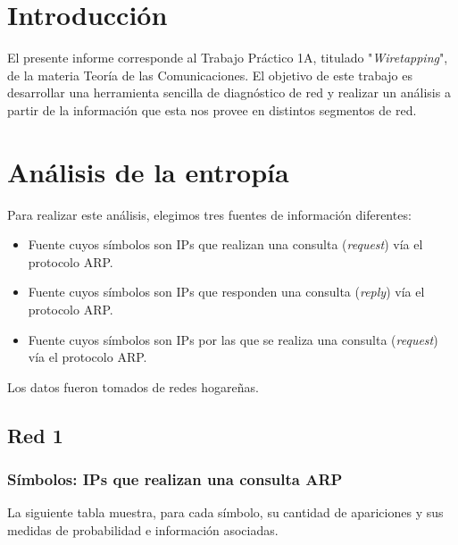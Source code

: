 \documentclass{article}
\begin{document}





\maketitle


\section{Introducción}
El presente informe corresponde al Trabajo Práctico 1A, titulado
"\emph{Wiretapping}", de la materia Teoría de las Comunicaciones. El objetivo
de este trabajo es desarrollar una herramienta sencilla de diagnóstico de red
y realizar un análisis a partir de la información que esta nos provee en
distintos segmentos de red.

\section{Análisis de la entropía}
Para realizar este análisis, elegimos tres fuentes de información diferentes:

\begin{itemize}
    \item Fuente cuyos símbolos son IPs que realizan una consulta
        (\emph{request}) vía el protocolo ARP.
    \item Fuente cuyos símbolos son IPs que responden una consulta
        (\emph{reply}) vía el protocolo ARP.
    \item Fuente cuyos símbolos son IPs por las que se realiza una consulta
        (\emph{request}) vía el protocolo ARP.
\end{itemize}

Los datos fueron tomados de redes hogareñas.

\subsection{Red 1}
\subsubsection{Símbolos: IPs que realizan una consulta ARP}
La siguiente tabla muestra, para cada símbolo, su cantidad de apariciones y
sus medidas de probabilidad e información asociadas.
\end{document}
